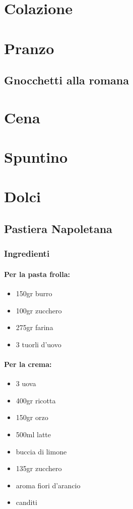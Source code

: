 
\chapter{Colazione}

\chapter{Pranzo}
\section{Gnocchetti alla romana}
\chapter{Cena}

\chapter{Spuntino}
\chapter{Dolci}
\section{Pastiera Napoletana}
\subsection{Ingredienti}
\subsubsection{Per la pasta frolla:}
\begin{itemize}
\item 150gr burro
\item 100gr zucchero
\item 275gr farina
\item 3 tuorli d'uovo
\end{itemize}
\subsubsection{Per la crema:}
\begin{itemize}
\item 3 uova
\item 400gr ricotta
\item 150gr orzo
\item 500ml latte
\item buccia di limone
\item 135gr zucchero
\item aroma fiori d'arancio
\item canditi
\end{itemize}
